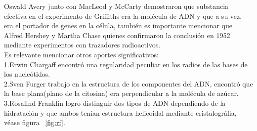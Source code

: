 Oswald Avery junto con MacLeod y McCarty demostraron que substancia efectiva en el experimento de Griffiths era la molécula de ADN y que a su vez, era el portador de genes en la célula, también es importante mencionar que Alfred Hershey y Martha Chase quienes confirmaron la conclusión en 1952 mediante experimentos con trazadores radioactivos\cite{Thormod}.\\

Es relevante mencionar otros aportes significativos: \\
1.Erwin Chargaff encontró una regularidad peculiar en los radios de las bases de los nucleótidos.\\
2.Sven Furger trabajo en la estructura de los componentes del ADN, encontró que la base plana(plano de la citosina) era perpendicular a la molécula de azúcar.\\
3.Rosalind Franklin logro distinguir dos tipos de ADN dependiendo de la hidratación y que ambos tenían estructura helicoidal mediante cristalográfia, véase figura ~\ref{fig:rf}.\\

